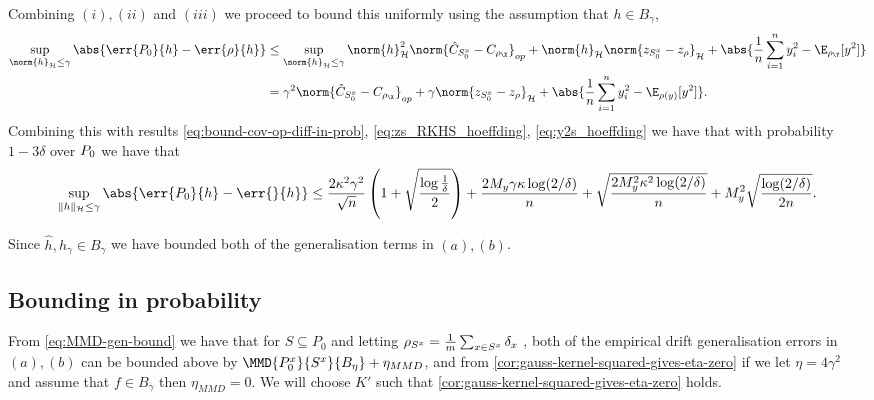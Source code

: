Combining \((i), (ii)\) and \((iii)\) we proceed to bound this uniformly using
the assumption that \(h \in B_{\gamma}\),
\begin{align*}
  \sup_{\norm{h}_{\rkhs{H}} \leq \gamma} \abs{\err{\poolset_0}{h} - \err{\rho}{h}} & \leq \sup_{\norm{h}_{\rkhs{H}} \leq \gamma}
                                                                                     \norm{h}_{\rkhs{H}}^2\norm{\hat{C}_{\trainsetx_0} - C_{\rho_{\X}}}_{op} +
                                                                                     \norm{h}_{\rkhs{H}} \norm{z_{\trainsetx_0} - z_{\rho}}_{\rkhs{H}} + \abs{\frac{1}{n}
                                                                                     \sum_{i=1}^n y_i^2 - \E_{\rho_{\Y}}[y^2]} \\
                                                                                   & = \gamma^2 \norm{\hat{C}_{\trainsetx_0}
                                                                                     - C_{\rho_{\X}}}_{op} + \gamma \norm{z_{\trainsetx_0} - z_{\rho}}_{\rkhs{H}} +
                                                                                     \abs{\frac{1}{n} \sum_{i=1}^n y_i^2 - \E_{\rho(y)}[y^2]}.
\end{align*}
Combining this with results
\ref{eq:bound-cov-op-diff-in-prob}, \ref{eq:zs_RKHS_hoeffding}, \ref{eq:y2s_hoeffding} we have that with probability \(1 - 3\delta\) over \(P_0\) we have that
\begin{equation}
  \label{eq:uniform-bound-gen-error-over-ball}
  \sup_{\|h\|_{\rkhs{H}} \leq \gamma} \abs{\err{\poolset_0}{h} -\err{}{h}} \leq \frac{2 \kappa^2 \gamma^2}{\sqrt{n}}  \left(1 + \sqrt{\frac{\log \frac{1}{\delta}}{2}} \right) + \frac{2 M_y \gamma \kappa \log(2/\delta)}{n} + \sqrt{\frac{2 M_y^2 \kappa^2 \log(2/\delta)}{n}} + M_y^2\sqrt{\frac{\log(2/\delta)}{2n}}.
\end{equation}

Since \(\hat{h}, h_{\gamma} \in B_{\gamma}\) we have bounded both of the
generalisation terms in \((a), (b)\).

\subsection{Bounding in probability}
From \ref{eq:MMD-gen-bound} we have that for \(S \subseteq P_{0}\) and
letting \(\rho_{S^x} = \frac{1}{m} \sum_{x \in S^x}\delta_{x}\)
, both of the empirical drift generalisation errors in \((a), (b)\) can be
bounded above by \(\MMD{\poolsetx_{0}}{\trainsetx}{B_{\eta}} + \eta_{MMD}\),
and from \ref{cor:gauss-kernel-squared-gives-eta-zero} if we let \(\eta =
4\gamma^{2}\) and assume that \(f \in B_{\gamma}\) then \(\eta_{MMD} = 0\). We will choose \(K'\) such that
\ref{cor:gauss-kernel-squared-gives-eta-zero} holds.

